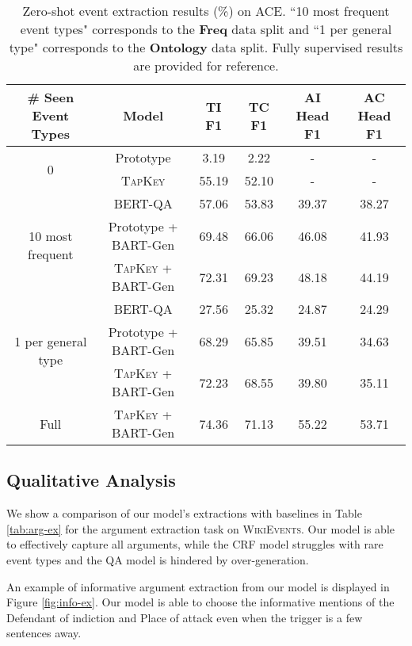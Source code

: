 \begin{table*}[t]
    \centering
    \small 
    \begin{tabular}{c|c| c c c c   }
          \toprule 
      \# Seen Event Types &  Model  & TI F1 &  TC F1 & AI Head F1 &  AC Head F1  \\
      \midrule 
       \multirow{2}{*}{0} 
       & Prototype &  3.19 & 2.22  & - & -  \\
      & \textsc{TapKey} &  55.19 &  52.10 &- & -\\
      \midrule 
       \multirow{3}{*}{10 most frequent} 
      & BERT-QA &  57.06 &  53.83 & 39.37  & 38.27  \\
         & Prototype + BART-Gen  & 69.48  & 66.06 & 46.08 & 41.93  \\
       & \textsc{TapKey} + BART-Gen &  72.31  & 69.23  & 48.18 &  44.19 \\
      \midrule 
       \multirow{3}{*}{1 per general type} 
      & BERT-QA & 27.56 & 25.32 &24.87  & 24.29 \\
      & Prototype + BART-Gen & 68.29 & 65.85 & 39.51 &  34.63  \\
      & \textsc{TapKey} + BART-Gen  & 72.23 & 68.55 & 39.80  & 35.11 \\
      \midrule 
      \multirow{1}{*}{Full} 
      &  \textsc{TapKey} + BART-Gen & 74.36 & 71.13 & 55.22 & 53.71 \\ 
         \bottomrule 
    \end{tabular}
    \caption{Zero-shot event extraction results (\%) on \textsc{ACE}. ``10 most frequent event types" corresponds to the \textbf{Freq} data split and ``1 per general type" corresponds to the \textbf{Ontology} data split. Fully supervised results are provided for reference. }
    \label{tab:zero-shot}
    \vspace{-0.2cm}
\end{table*}

\subsection{Qualitative Analysis}
We show a comparison of our model's extractions with baselines in Table \ref{tab:arg-ex} for the argument extraction task on \textsc{WikiEvents}.
Our model is able to effectively capture all arguments, while the CRF model struggles with rare event types and the QA model is hindered by over-generation.

An example of informative argument extraction from our model is displayed in Figure \ref{fig:info-ex}. 
Our model is able to choose the informative mentions of the Defendant of indiction and Place of attack even when the trigger is a few sentences away.

